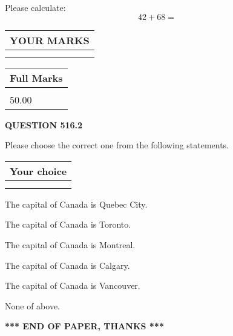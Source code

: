 \documentclass[12pt]{article}
\begin{document}
  
 
Please calculate:
\begin{equation}
42 +  %
68 = \nonumber
\end{equation}
 

 

 
  
\vspace{0.2in}
  
\noindent\begin{tabular}{|l|}
\hline
 YOUR MARKS  \\
\hline
 \\ 
 \\ 
\hline
\end{tabular}
\hspace{0.05in} \begin{tabular}{|l|}
\hline
 Full Marks  \\
\hline
 \\ 
50.00 \\
\hline
\end{tabular}
{\textbf{\Large{QUESTION
516.2 
}}}
  
  
Please choose the correct one from the following statements.
  
  
\noindent\hspace{3.0in} \begin{tabular}{|l|}
\hline
Your choice \\
\hline
 \\ 
 \\ 
\hline
\end{tabular}
  
  
 
 
The capital of Canada is Quebec City.
 
 
The capital of Canada is Toronto.
 
 
The capital of Canada is Montreal.
 
 
The capital of Canada is Calgary.
 
 
The capital of Canada is Vancouver.
 
 
 None of above.
 
 
   
   
 \vspace{0.2in}
 
   
   
   
   
\vspace{1.0in} 
{\textbf{\large{ *** END OF PAPER, THANKS *** }}} 
   
\end{document}
